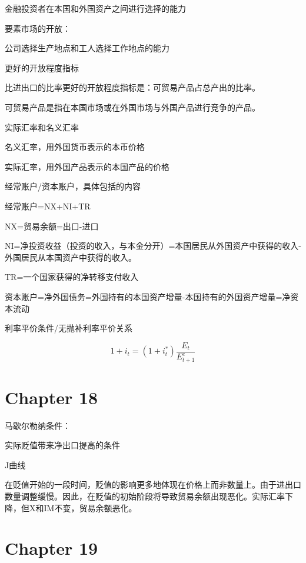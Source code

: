 \documentclass{article}
\begin{document}
金融投资者在本国和外国资产之间进行选择的能力

要素市场的开放：

公司选择生产地点和工人选择工作地点的能力

\hspace*{\fill}

更好的开放程度指标

比进出口的比率更好的开放程度指标是：可贸易产品占总产出的比率。

可贸易产品是指在本国市场或在外国市场与外国产品进行竞争的产品。

\hspace*{\fill}

实际汇率和名义汇率

名义汇率，用外国货币表示的本币价格

实际汇率，用外国产品表示的本国产品的价格

\hspace*{\fill}

经常账户/资本账户，具体包括的内容

经常账户=NX+NI+TR

NX=贸易余额=出口-进口

NI=净投资收益（投资的收入，与本金分开）=本国居民从外国资产中获得的收入-外国居民从本国资产中获得的收入。

TR=一个国家获得的净转移支付收入

资本账户=净外国债务=外国持有的本国资产增量-本国持有的外国资产增量=净资本流动


\hspace*{\fill}

利率平价条件/无抛补利率平价关系

\[
1+i_t=(1+i_t^*)\frac{E_t}{E^e_{t+1}}
\]

\section{Chapter 18}

马歇尔勒纳条件：

实际贬值带来净出口提高的条件

\hspace*{\fill}

J曲线

在贬值开始的一段时间，贬值的影响更多地体现在价格上而非数量上。由于进出口数量调整缓慢。因此，在贬值的初始阶段将导致贸易余额出现恶化。实际汇率下降，但X和IM不变，贸易余额恶化。

\section{Chapter 19}
\end{document}
